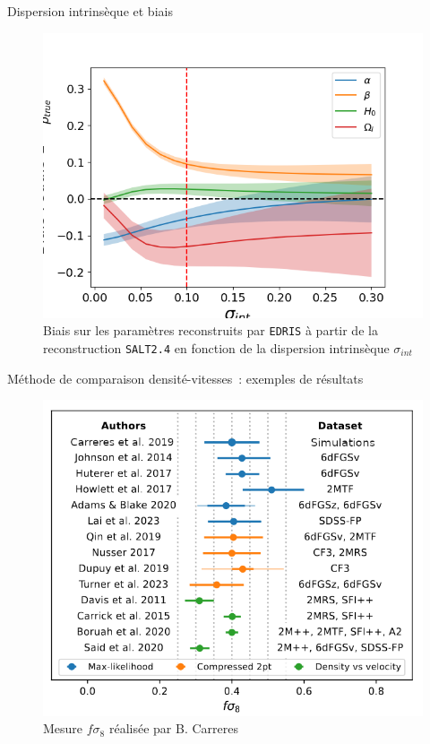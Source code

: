 \documentclass{beamer}
\def\edris{\texttt{EDRIS}\xspace}
\def\saltd{\texttt{SALT2.4}\xspace}
\begin{document}
\begin{frame}{Dispersion intrinsèque et biais}
\begin{figure}
	\centering
	\includegraphics[height=.7\textheight]{figures/edris_biais.png}
	\caption{Biais sur les paramètres reconstruits par \edris à partir de la reconstruction \saltd en fonction de la dispersion intrinsèque $\sigma_{int}$}
\end{figure}
\end{frame}


\begin{frame}{Méthode de comparaison densité-vitesses~: exemples de résultats}
\begin{figure}
	\centering
	\includegraphics[height=.7\textheight]{figures/Carreres_fig_11.png}
	\caption{Mesure $f\sigma_8$ réalisée par B. Carreres}
\end{figure}
\end{frame}
\end{document}
